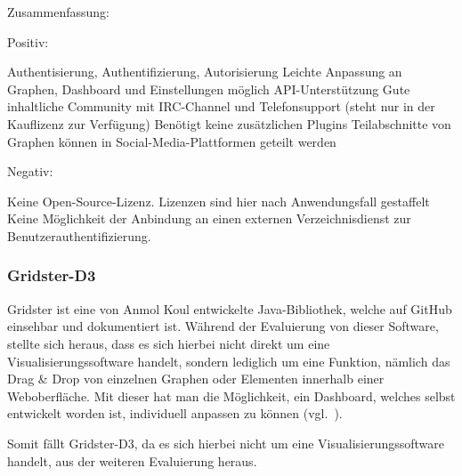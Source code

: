 {Zusammenfassung:

Positiv:

\begin{outline}
  \1 Authentisierung, Authentifizierung, Autorisierung
  \1 Leichte Anpassung an Graphen, Dashboard und Einstellungen möglich
  \1 API\hyp{}Unterstützung
  \1 Gute inhaltliche Community mit IRC\hyp{}Channel und Telefonsupport (steht
  nur in der Kauflizenz zur Verfügung)
  \1 Benötigt keine zusätzlichen Plugins
  \1 Teilabschnitte von Graphen können in Social\hyp{}Media\hyp{}Plattformen
  geteilt werden
\end{outline}

Negativ:

\begin{outline}
  \1 Keine Open\hyp{}Source\hyp{}Lizenz. Lizenzen sind hier nach Anwendungsfall
  gestaffelt
  \1 Keine Möglichkeit der Anbindung an einen externen Verzeichnisdienst zur
  Benutzerauthentifizierung.
\end{outline}
\mr%

\subsubsection{Gridster-D3}
\label{subsubsec:gridster-d3}
Gridster ist eine von Anmol Koul entwickelte Java\hyp{}Bibliothek, welche auf
\gls{GitHub} einsehbar und dokumentiert ist. Während der Evaluierung von dieser
Software, stellte sich heraus, dass es sich hierbei nicht direkt um eine
Visualisierungssoftware handelt, sondern lediglich um eine Funktion, nämlich
das Drag \& Drop von einzelnen Graphen oder Elementen innerhalb einer
Weboberfläche. Mit dieser hat man die Möglichkeit, ein Dashboard, welches
selbst entwickelt worden ist, individuell anpassen zu
können (vgl.~\cite{gridster-d3}).

Somit fällt Gridster\hyp{}D3, da es sich hierbei nicht um eine
Visualisierungssoftware handelt, aus der weiteren Evaluierung heraus.

}
